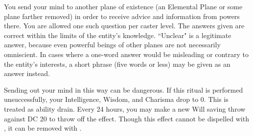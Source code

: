 \begin{spelleffect}
You send your mind to another plane of existence (an Elemental Plane or some plane farther removed) in order to receive advice and information from powers there. You are allowed one such question per caster level. The answers given are correct within the limits of the entity's knowledge. ``Unclear" is a legitimate answer, because even powerful beings of other planes are not necessarily omniscient. In cases where a one-word answer would be misleading or contrary to the entity's interests, a short phrase (five words or less) may be given as an answer instead.

Sending out your mind in this way can be dangerous. If this ritual is performed unsuccessfully, your Intelligence, Wisdom, and Charisma drop to 0. This is treated as ability drain. Every 24 hours, you may make a new Will saving throw against DC 20 to throw off the effect. Though this effect cannot be dispelled with , it can be removed with .
\end{spelleffect}

